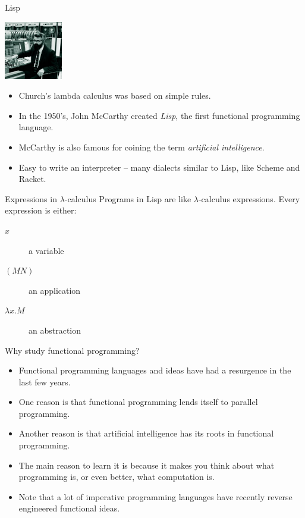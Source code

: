\begin{frame}{Lisp}
  \begin{center}
    \includegraphics[height=1in]{img/mccarthy.jpg}
  \end{center}
  \begin{itemize}
    \item Church’s lambda calculus was based on simple rules.
    \item In the 1950’s, John McCarthy created \emph{Lisp}, the first functional programming language.
    \item McCarthy is also famous for coining the term \emph{artificial intelligence}.
    \item Easy to write an interpreter -- many dialects similar to Lisp, like Scheme and Racket.
  \end{itemize}
\end{frame}


\begin{frame}{Expressions in $\lambda$-calculus}
  Programs in Lisp are like $\lambda$-calculus expressions. Every expression is either:
  \begin{description}
    \item[$x$] a variable
    \item[$(M N)$] an application
    \item[$\lambda x.M$] an abstraction
  \end{description}
\end{frame}


\begin{frame}{Why study functional programming?}
  \begin{itemize}
    \item Functional programming languages and ideas have had a resurgence in the last few years.
    \item One reason is that functional programming lends itself to parallel programming.
    \item Another reason is that artificial intelligence has its roots in functional programming.
    \item The main reason to learn it is because it makes you think about what programming is, or even better, what computation is.
    \item Note that a lot of imperative programming languages have recently reverse engineered functional ideas.
  \end{itemize}
\end{frame}

